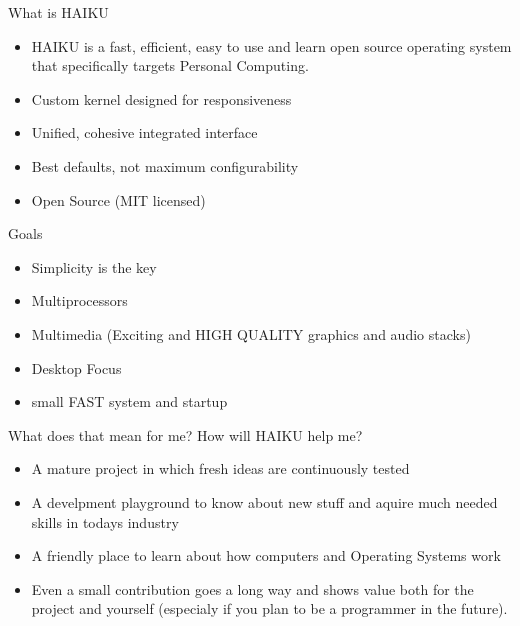 \documentclass{beamer}
\begin{document}
    \begin{frame}{What is HAIKU}
        \begin{itemize}
            \item HAIKU is a fast, efficient, easy to use and learn
                  open source operating system that specifically targets 
                  Personal Computing.
            \item Custom kernel designed for responsiveness
            \item Unified, cohesive integrated interface
            \item Best defaults, not maximum configurability
            \item Open Source (MIT licensed)
        \end{itemize}
    \end{frame}

    \begin{frame}{Goals}
        \begin{itemize}
            \item Simplicity is the key
            \item Multiprocessors
            \item Multimedia (Exciting and HIGH QUALITY graphics and audio stacks)
            \item Desktop Focus
            \item small FAST system and startup
        \end{itemize}
    \end{frame}

    \begin{frame}{What does that mean for me? How will HAIKU help me?}
        \begin{itemize}
            \item A mature project in which fresh ideas are continuously tested
            \item A develpment playground to know about new stuff and aquire
                  much needed skills in todays industry
            \item A friendly place to learn about how computers and Operating Systems work
            \item Even a small contribution goes a long way and shows value both
                  for the project and yourself (especialy if you plan to be a
                  programmer in the future).
        \end{itemize}
    \end{frame}
\end{document}

